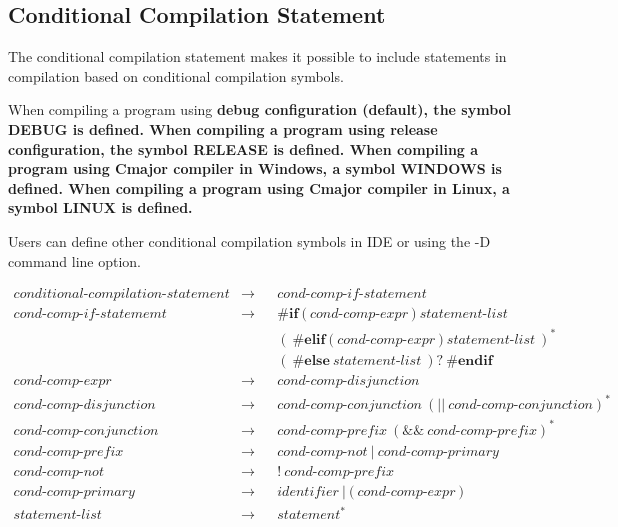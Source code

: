 \documentclass[a4paper,oneside,11pt]{article}
\begin{document}
\subsection{Conditional Compilation Statement}\label{conditionalcompilationstatement}

The conditional compilation statement makes it possible to include statements in compilation
based on conditional compilation symbols.

When compiling a program using \bf{debug} configuration (default), the symbol DEBUG is defined.
When compiling a program using \bf{release} configuration, the symbol RELEASE is defined.
When compiling a program using Cmajor compiler in Windows, a symbol WINDOWS is defined.
When compiling a program using Cmajor compiler in Linux, a symbol LINUX is defined.

Users can define other conditional compilation symbols in IDE or using the -D command line option.

\begin{align*}
conditional\textrm{-}compilation\textrm{-}statement &\rightarrow & &cond\textrm{-}comp\textrm{-}if\textrm{-}statement\\
cond\textrm{-}comp\textrm{-}if\textrm{-}statememt &\rightarrow & &\texttt{\#} \textbf{if} \> \texttt{(} \> cond\textrm{-}comp\textrm{-}expr \> \texttt{)} \>
statement\textrm{-}list\\
& & &(\> \texttt{\#} \textbf{elif} \> \texttt{(} \> cond\textrm{-}comp\textrm{-}expr \> \texttt{)} \> statement\textrm{-}list \>)^*\\
& & &(\> \texttt{\#} \textbf{else} \> statement\textrm{-}list \>)? \> \texttt{\#} \textbf{endif}\\
cond\textrm{-}comp\textrm{-}expr &\rightarrow & &cond\textrm{-}comp\textrm{-}disjunction\\
cond\textrm{-}comp\textrm{-}disjunction &\rightarrow & &cond\textrm{-}comp\textrm{-}conjunction \> (\texttt{||} \>
cond\textrm{-}comp\textrm{-}conjunction )^*\\
cond\textrm{-}comp\textrm{-}conjunction &\rightarrow & &cond\textrm{-}comp\textrm{-}prefix \> (\texttt{\&\&} \> cond\textrm{-}comp\textrm{-}prefix )^*\\
cond\textrm{-}comp\textrm{-}prefix &\rightarrow & &cond\textrm{-}comp\textrm{-}not \> | \> cond\textrm{-}comp\textrm{-}primary\\
cond\textrm{-}comp\textrm{-}not &\rightarrow & &\texttt{!} \> cond\textrm{-}comp\textrm{-}prefix\\
cond\textrm{-}comp\textrm{-}primary &\rightarrow & &\hyperref[identifier]{identifier} \> | \> \texttt{(} \> cond\textrm{-}comp\textrm{-}expr \> \texttt{)}\\
statement\textrm{-}list &\rightarrow & &\hyperref[statement]{statement}^*
\end{align*}
\end{document}
